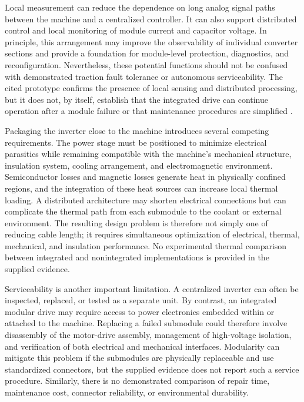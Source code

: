 Local measurement can reduce the dependence on long analog signal paths between the machine and a centralized controller. It can also support distributed control and local monitoring of module current and capacitor voltage. In principle, this arrangement may improve the observability of individual converter sections and provide a foundation for module-level protection, diagnostics, and reconfiguration. Nevertheless, these potential functions should not be confused with demonstrated traction fault tolerance or autonomous serviceability. The cited prototype confirms the presence of local sensing and distributed processing, but it does not, by itself, establish that the integrated drive can continue operation after a module failure or that maintenance procedures are simplified \cite{Jin2017}. %

Packaging the inverter close to the machine introduces several competing requirements. The power stage must be positioned to minimize electrical parasitics while remaining compatible with the machine's mechanical structure, insulation system, cooling arrangement, and electromagnetic environment. Semiconductor losses and magnetic losses generate heat in physically confined regions, and the integration of these heat sources can increase local thermal loading. A distributed architecture may shorten electrical connections but can complicate the thermal path from each submodule to the coolant or external environment. The resulting design problem is therefore not simply one of reducing cable length; it requires simultaneous optimization of electrical, thermal, mechanical, and insulation performance. No experimental thermal comparison between integrated and nonintegrated implementations is provided in the supplied evidence. %

Serviceability is another important limitation. A centralized inverter can often be inspected, replaced, or tested as a separate unit. By contrast, an integrated modular drive may require access to power electronics embedded within or attached to the machine. Replacing a failed submodule could therefore involve disassembly of the motor-drive assembly, management of high-voltage isolation, and verification of both electrical and mechanical interfaces. Modularity can mitigate this problem if the submodules are physically replaceable and use standardized connectors, but the supplied evidence does not report such a service procedure. Similarly, there is no demonstrated comparison of repair time, maintenance cost, connector reliability, or environmental durability. %

